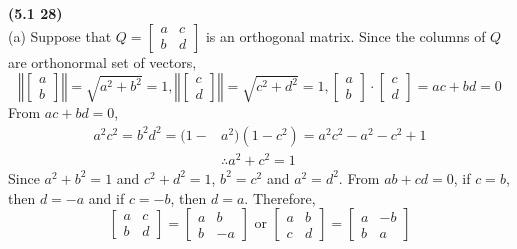 \textbf{(5.1 28)} \\
(a) Suppose that $Q = \begin{bmatrix}
	a & c \\ b & d
\end{bmatrix}$ is an orthogonal matrix. Since the columns of $Q$ are orthonormal set of vectors, \begin{equation*}
	\left \Vert \begin{bmatrix}
		a \\ b
	\end{bmatrix} \right \Vert = \sqrt{a^2 + b^2} = 1, \left \Vert \begin{bmatrix}
		c \\ d
	\end{bmatrix} \right \Vert = \sqrt{c^2 + d^2} = 1, \begin{bmatrix}
		a \\ b
	\end{bmatrix} \cdot \begin{bmatrix}
		c \\ d
	\end{bmatrix} = ac + bd = 0
\end{equation*}
From $ac + bd = 0$,
\begin{align*}
	a^2c^2 = b^2d^2 = (1 - &a^2)(1 - c^2) = a^2c^2 - a^2 - c^2 + 1 \\
	&\therefore a^2 + c^2 = 1
\end{align*}
Since $a^2 + b^2 = 1$ and $c^2 + d^2 = 1$, $b^2 = c^2$ and $a^2 = d^2$. From $ab + cd = 0$, if $c = b$, then $d = -a$ and if $c = -b$, then $d = a$. Therefore, \begin{equation*}
	\begin{bmatrix}
		a & c \\ b & d
	\end{bmatrix} = \begin{bmatrix}
		a & b \\ b & -a
	\end{bmatrix} \mbox{ or } \begin{bmatrix}
		a & b \\ c & d
	\end{bmatrix} = \begin{bmatrix}
		a & -b \\ b & a
	\end{bmatrix}
\end{equation*}

